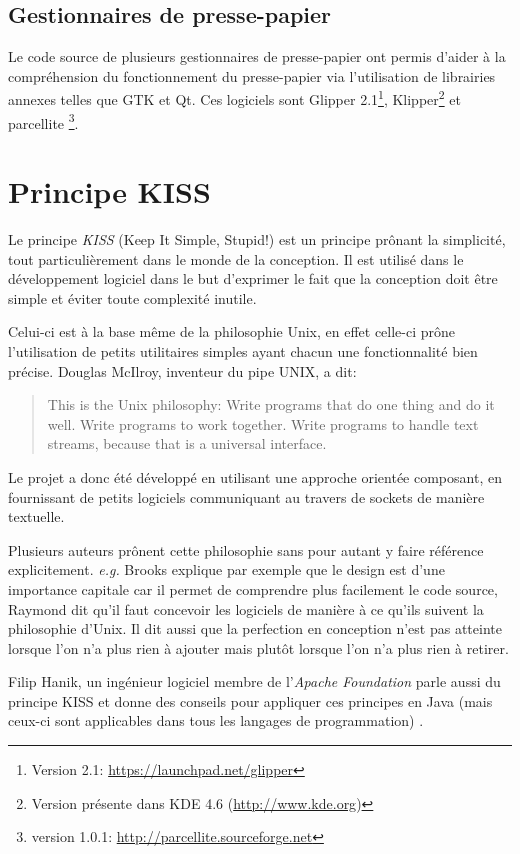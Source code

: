 \section*{Gestionnaires de presse-papier}
Le code source de plusieurs gestionnaires de presse-papier ont permis d'aider
à la compréhension du fonctionnement du presse-papier via l'utilisation de
librairies annexes telles que GTK et Qt.
Ces logiciels sont Glipper 2.1\footnote{Version 2.1:
\url{https://launchpad.net/glipper}},
Klipper\footnote{Version présente dans KDE 4.6 (\url{http://www.kde.org})} et
parcellite \footnote{version 1.0.1: \url{http://parcellite.sourceforge.net}}.

\chapter{Principe KISS}\label{ann:kiss}
\renewcommand{\leftmark}{ANNEXE \thechapter.~~Principe KISS}
\label{annexe2}
Le principe \emph{KISS} (Keep It Simple, Stupid!) \cite{wiki:kiss} est un
principe prônant la simplicité, tout particulièrement dans le monde de la
conception.
Il est utilisé dans le développement logiciel dans le but d'exprimer le fait
que la conception doit être simple et éviter toute complexité inutile.

Celui-ci est à la base même de la philosophie Unix, en effet celle-ci prône
l'utilisation de petits utilitaires simples ayant chacun une fonctionnalité
bien précise.
Douglas McIlroy, inventeur du pipe UNIX, a dit\cite{quartercentury-unix}:
\begin{quote}
  This is the Unix philosophy: Write programs that do one thing and do
  it well. Write programs to work together. Write programs to handle
  text streams, because that is a universal interface.
\end{quote}
Le projet a donc été développé en utilisant une approche orientée
composant\cite{wiki:poc}, en fournissant de petits
logiciels communiquant au travers de sockets de manière textuelle.

Plusieurs auteurs
\cite{Brooks1995, Raymond2001} prônent cette philosophie sans pour autant
y faire référence explicitement. \emph{e.g.} Brooks explique par exemple
que le design est d'une importance capitale car il permet de comprendre
plus facilement le code source, Raymond dit qu'il faut concevoir les logiciels
de manière à ce qu'ils suivent la philosophie d'Unix. Il dit aussi que
la perfection en conception n'est pas atteinte lorsque l'on n'a plus rien à
ajouter mais plutôt lorsque l'on n'a plus rien à retirer.

Filip Hanik, un ingénieur logiciel membre de l'\emph{Apache Foundation} parle
aussi du principe KISS et donne des conseils pour appliquer ces principes en
Java (mais ceux-ci sont applicables dans tous les langages de programmation)
\cite{fhanikKISS}.
